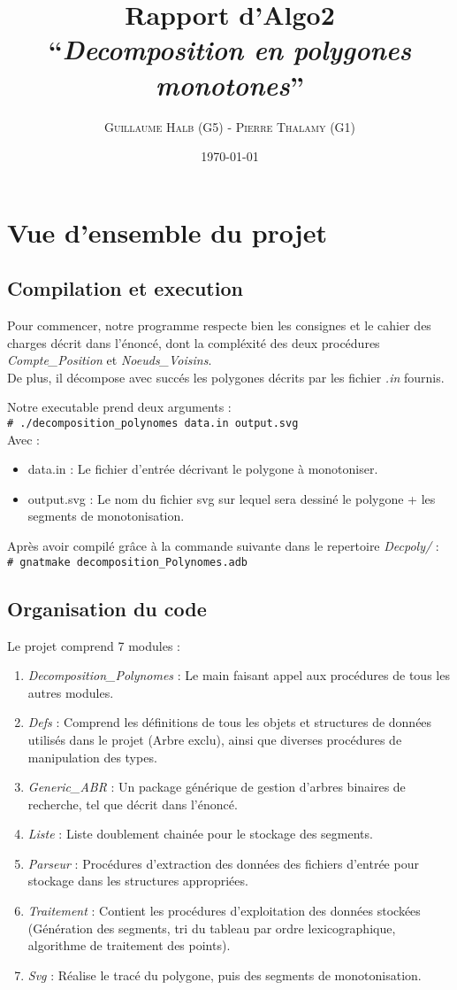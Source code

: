 \documentclass[10.9pt]{article}
\title{Rapport d'Algo2\\
  ``{\em Decomposition en polygones monotones}'' }
\author{\textsc{Guillaume Halb (G5)} - \textsc{Pierre Thalamy (G1)}}
\date{\today}
\newcommand{\shellcmd}[1]{\\\indent\indent\texttt{\footnotesize\# #1}\\}
\begin{document}
\maketitle

\section{Vue d'ensemble du projet}
\subsection{Compilation et execution}
Pour commencer, notre programme respecte bien les consignes et le
cahier des charges décrit dans l'énoncé, dont la compléxité des deux
procédures \emph{Compte\_Position} et \emph{Noeuds\_Voisins}. \\
De plus, il décompose avec
succés les polygones décrits par les fichier \emph{.in} fournis.

Notre executable prend deux arguments :
\shellcmd{./decomposition\_polynomes data.in output.svg}
Avec :
\begin{itemize}
  \item data.in : Le fichier d'entrée décrivant le polygone à
    monotoniser.
  \item output.svg : Le nom du fichier svg sur lequel sera dessiné le
    polygone + les segments de monotonisation.
\end{itemize}
Après avoir compilé grâce à la commande suivante dans le repertoire \emph{Decpoly/} :
\shellcmd{gnatmake decomposition\_Polynomes.adb}

\subsection{Organisation du code}

Le projet comprend 7 modules :
\begin{enumerate}
\item \emph{Decomposition\_Polynomes} : Le main faisant appel aux procédures de tous
  les autres modules.
\item \emph{Defs} : Comprend les définitions de tous les objets et
  structures de données utilisés dans le projet (Arbre exclu), ainsi que diverses
  procédures de manipulation des types.
\item \emph{Generic\_ABR} : Un package générique de gestion d'arbres
  binaires de recherche, tel que décrit dans l'énoncé.
\item \emph{Liste} : Liste doublement chainée pour le stockage des
  segments.
\item \emph{Parseur} : Procédures d'extraction des données des fichiers
  d'entrée pour stockage dans les structures appropriées.
\item \emph{Traitement} : Contient les procédures d'exploitation des
  données stockées (Génération des segments, tri du
  tableau par ordre lexicographique, algorithme de traitement des points).
\item \emph{Svg} : Réalise le tracé du polygone, puis des segments de monotonisation.
\end{enumerate}
\end{document}

